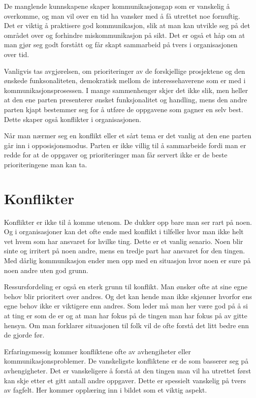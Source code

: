 \documentclass[12pt, a4paper]{article}
\begin{document}
De manglende kunnskapene skaper kommunikasjonsgap som er vanskelig å overkomme,
og man vil over en tid ha vansker med å få utrettet noe fornuftig. Det er
viktig å praktisere god kommunikasjon, slik at man kan utvikle seg på det
området over og forhindre miskommunikasjon på sikt. Det er også et håp om at
man gjør seg godt forstått og får skapt sammarbeid på tvers i organisasjonen
over tid.  

Vanligvis tas avgjørelsen, om prioriteringer av de forskjellige prosjektene og den ønskede
funksonaliteten, demokratisk mellom de interessehaverene som er med i
kommunikasjonsprosessen. I mange sammenhenger skjer det ikke slik, men heller
at den ene parten presenterer ønsket funksjonalitet og handling, mens den andre
parten kjapt bestemmer seg for å utføre de oppgavene som gagner en selv best.
Dette skaper også konflikter i organisasjonen.  

Når man nærmer seg en konflikt eller et sårt tema er det vanlig at den ene
parten går inn i opposisjonsmodus. Parten er ikke villig til å sammarbeide
fordi man er redde for at de oppgaver og prioriteringer man får servert ikke er
de beste prioriteringene man kan ta. 

\section{Konflikter}
 
Konflikter er ikke til å komme utenom. De dukker opp bare man ser rart på noen.
Og i organisasjoner kan det ofte ende med konflikt i tilfeller hvor man
ikke helt vet hvem som har ansvaret for hvilke ting. Dette er et vanlig
senario. Noen blir sinte og irritert på noen andre, mens en tredje part har
ansvaret for den tingen. Med dårlig kommunikasjon ender men opp med en
situasjon hvor noen er sure på noen andre uten god grunn.

Ressursfordeling er også en sterk grunn til konflikt. Man ønsker ofte at sine
egne behov blir prioritert over andres. Og det kan hende man ikke skjønner
hvorfor ens egne behov ikke er viktigere enn andres. Som leder må man her være
god på å si at ting er som de er og at man har fokus på de tingen man har fokus
på av gitte hensyn. Om man forklarer situasjonen til folk vil de ofte forstå
det litt bedre enn de gjorde før. 

Erfaringsmessig kommer konfliktene ofte av avhengiheter eller
kommunikasjonsproblemer. De vanskeligste konfliktene er de som basserer seg på
avhengigheter. Det er vanskeligere å forstå at den tingen man vil ha utrettet
først kan skje etter et gitt antall andre oppgaver. Dette er spessielt
vanskelig på tvers av fagfelt. Her kommer opplæring inn i bildet som et viktig
aspekt. 
\end{document}
